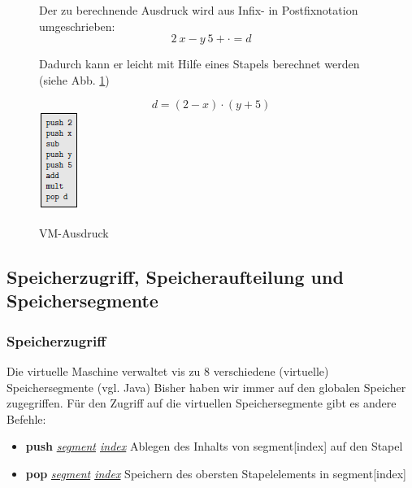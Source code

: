 \documentclass[12pt]{report}
\begin{document}
\begin{figure}[H]
  \begin{minipage}[t]{0.45\textwidth}
    Der zu berechnende Ausdruck wird aus Infix- in Postfixnotation umgeschrieben:
    $$2\ x - y\ 5 + \cdot = d$$
    
    Dadurch kann er leicht mit Hilfe eines Stapels berechnet werden (siehe Abb. \ref{fig:auswertung_arithmetik_vm})
  \end{minipage}
  \hfill
  \begin{minipage}[t]{0.45\textwidth}
    \caption{VM-Ausdruck}
    $$d = (2-x) \cdot (y+5)$$
    \label{fig:auswertung_arithmetik_vm}
    \centering
    \includegraphics{auswertung_arithmetik_vm}
  \end{minipage}
\end{figure}

\subsection{Speicherzugriff, Speicheraufteilung und Speichersegmente}
\subsubsection{Speicherzugriff}
Die virtuelle Maschine verwaltet vis zu 8 verschiedene (virtuelle) Speichersegmente (vgl. Java)
Bisher haben wir immer auf den globalen Speicher zugegriffen. Für den Zugriff auf die virtuellen Speichersegmente gibt es andere Befehle:

\begin{itemize}
  \item \textbf{push} \textit{\underline{segment} \underline{index}}
        \subitem Ablegen des Inhalts von segment[index] auf den Stapel
        
  \item \textbf{pop} \textit{\underline{segment} \underline{index}}
        \subitem Speichern des obersten Stapelelements in segment[index]
\end{itemize}
\end{document}
